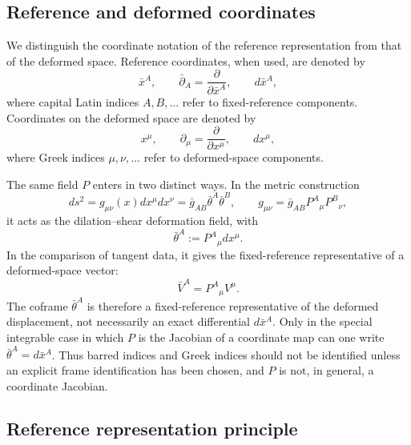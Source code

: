 \documentclass[12pt]{amsart}
\theoremstyle{definition}
\theoremstyle{remark}
\begin{document}
\subsection{Reference and deformed coordinates}\label{subsec:reference_deformed_coordinates}

We distinguish the coordinate notation of the reference representation from that of the deformed space. Reference coordinates, when used, are denoted by
\[
 \bar x^A,\qquad \bar\partial_A=\frac{\partial}{\partial \bar x^A},\qquad d\bar x^A,
\]
where capital Latin indices \(A,B,\ldots\) refer to fixed-reference components. Coordinates on the deformed space are denoted by
\[
 x^\mu,\qquad \partial_\mu=\frac{\partial}{\partial x^\mu},\qquad dx^\mu,
\]
where Greek indices \(\mu,\nu,\ldots\) refer to deformed-space components.

The same field \(P\) enters in two distinct ways. In the metric construction
\begin{equation}\label{eq:coordinate_distinction_metric}
 ds^2=g_{\mu\nu}(x)dx^\mu dx^\nu
 =\bar g_{AB}\bar\theta^A\bar\theta^B,
 \qquad
 g_{\mu\nu}=\bar g_{AB}P^A{}_{\mu}P^B{}_{\nu},
\end{equation}
it acts as the dilation--shear deformation field, with
\begin{equation}\label{eq:reference_coframe_representative}
 \bar\theta^A:=P^A{}_{\mu}dx^\mu .
\end{equation}
In the comparison of tangent data, it gives the fixed-reference representative of a deformed-space vector:
\begin{equation}\label{eq:coordinate_distinction_barV}
 \bar V^A=P^A{}_{\mu}V^\mu .
\end{equation}
The coframe \(\bar\theta^A\) is therefore a fixed-reference representative of the deformed displacement, not necessarily an exact differential \(d\bar x^A\). Only in the special integrable case in which \(P\) is the Jacobian of a coordinate map can one write \(\bar\theta^A=d\bar x^A\). Thus barred indices and Greek indices should not be identified unless an explicit frame identification has been chosen, and \(P\) is not, in general, a coordinate Jacobian.



\subsection{Reference representation principle}\label{subsec:reference_representation_principle}
\end{document}
